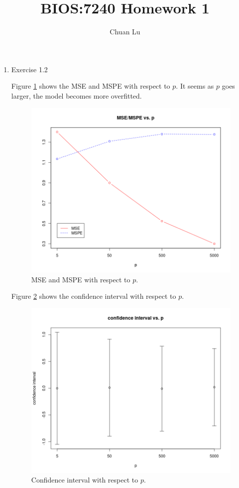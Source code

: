 \documentclass{article}
\begin{document}
\author{Chuan Lu}
\title{BIOS:7240 Homework 1}
\maketitle

\medskip

\begin{enumerate}
\item Exercise 1.2

Figure \ref{MSE-MSPE} shows the MSE and MSPE with respect to $p$. It seems as $p$ goes larger, the model becomes more overfitted.
\begin{figure}[htpb]
\centering
\includegraphics[scale=0.4]{MSE_MSPE.png}
\caption{MSE and MSPE with respect to $p$.}
\label{MSE-MSPE}
\end{figure}

Figure \ref{confint} shows the confidence interval with respect to $p$. 

\begin{figure}[htpb]
\centering
\includegraphics[scale=0.4]{confidence_interval.png}
\caption{Confidence interval with respect to $p$.}
\label{confint}
\end{figure}

\end{enumerate}
\end{document}
